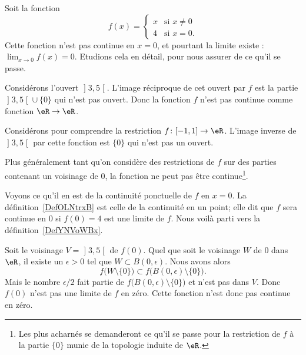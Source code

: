 \begin{example}     \label{EXooKREUooLeuIlv}
	Soit la fonction
	\begin{equation}        \label{EQooSYSWooSGsUfR}
		f(x)=\begin{cases}
			x & \text{si } x\neq 0 \\
			4 & \text{si } x=0.
		\end{cases}
	\end{equation}
	Cette fonction n'est pas continue en \( x=0\), et pourtant la limite existe : \( \lim_{x\to 0} f(x)=0\). Etudions cela en détail, pour nous assurer de ce qu'il se passe.

	Considérons l'ouvert \( \mathopen] 3 , 5 \mathclose[\). L'image réciproque de cet ouvert par \( f\) est la partie \( \mathopen] 3 , 5 \mathclose[\cup\{ 0 \}\) qui n'est pas ouvert. Donc la fonction \( f\) n'est pas continue comme fonction \( \eR\to \eR\).

		Considérons pour comprendre la restriction \( f\colon \mathopen[ -1 , 1 \mathclose]\to \eR\). L'image inverse de \( \mathopen] 3 , 5 \mathclose[\) par cette fonction est \( \{ 0 \}\) qui n'est pas un ouvert.

	Plus généralement tant qu'on considère des restrictions de \( f\) sur des parties contenant un voisinage de \( 0\), la fonction ne peut pas être continue\footnote{Les plus acharnés se demanderont ce qu'il se passe pour la restriction de \( f\) à la partie \( \{ 0 \}\) munie de la topologie induite de \( \eR\).}.

	Voyons ce qu'il en est de la continuité ponctuelle de \( f\) en \( x=0\). La définition~\ref{DefOLNtrxB} est celle de la continuité en un point; elle dit que \( f\) sera continue en \( 0\) si \( f(0)=4\) est une limite de \( f\). Nous voilà parti vers la définition~\ref{DefYNVoWBx}.

	Soit le voisinage \( V=\mathopen] 3 , 5 \mathclose[\) de \( f(0)\). Quel que soit le voisinage \( W\) de \( 0\) dans \( \eR\), il existe un \( \epsilon>0\) tel que \( W\subset B(0,\epsilon)\). Nous avons alors
	\begin{equation}
		f\big( W\setminus \{ 0 \} \big)\subset f\big( B(0,\epsilon)\setminus\{ 0 \} \big).
	\end{equation}
	Mais le nombre \( \epsilon/2\) fait partie de \( f\big( B(0,\epsilon)\setminus\{ 0 \} \big)\) et n'est pas dans \( V\). Donc \( f(0)\) n'est pas une limite de \( f\) en zéro. Cette fonction n'est donc pas continue en zéro.
\end{example}

